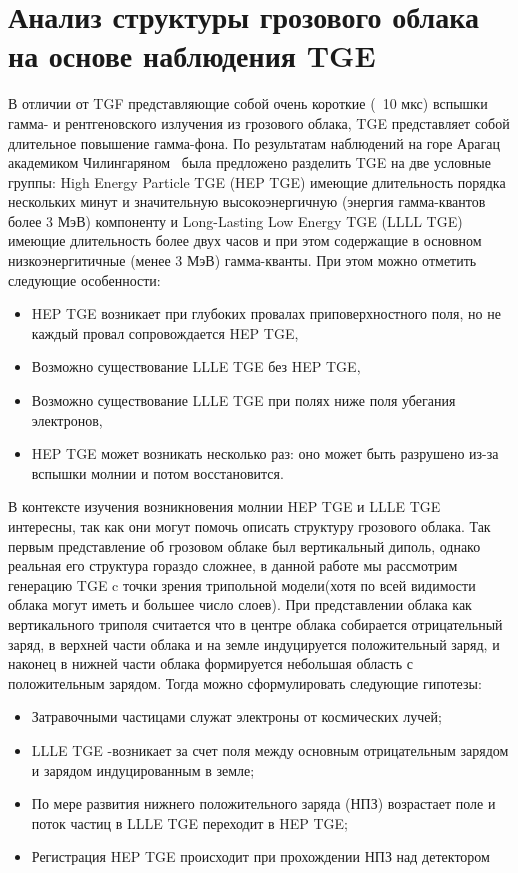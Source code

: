 \section{Анализ структуры грозового облака на основе наблюдения TGE}\label{sec:thunderstorm/llletge} 
В отличии от TGF представляющие собой очень короткие (~10 мкс) вспышки гамма- и рентгеновского излучения из грозового облака, TGE представляет собой длительное повышение гамма-фона. По результатам наблюдений на горе Арагац академиком Чилингаряном~\cite{PhysRevD.98.082001} была предложено разделить TGE на две условные группы: High Energy Particle TGE (HEP TGE) имеющие длительность порядка нескольких минут и значительную высокоэнергичную (энергия гамма-квантов более 3 МэВ) компоненту и Long-Lasting Low Energy TGE (LLLL TGE) имеющие длительность более двух часов и при этом содержащие в основном низкоэнергитичные (менее 3 МэВ) гамма-кванты. При этом можно отметить следующие особенности: 
\begin{itemize}
    \item HEP TGE  возникает при глубоких  провалах  приповерхностного поля, но не каждый провал сопровождается HEP TGE,
    \item Возможно существование LLLE TGE без  HEP TGE,
    \item Возможно существование LLLE TGE при полях ниже поля убегания электронов,
    \item HEP TGE может возникать несколько раз: оно может быть разрушено из-за вспышки молнии и потом восстановится.
\end{itemize}
В контексте изучения возникновения молнии HEP TGE и LLLE TGE интересны, так как они могут помочь описать структуру грозового облака.  Так первым представление об грозовом облаке был вертикальный диполь, однако реальная его структура гораздо сложнее, в данной работе мы рассмотрим генерацию TGE c точки зрения трипольной модели(хотя по всей видимости облака могут иметь и большее число слоев). При представлении облака как вертикального триполя считается что в центре облака собирается отрицательный заряд, в верхней части облака и на земле индуцируется положительный заряд, и наконец в нижней части облака формируется небольшая область с положительным зарядом. Тогда можно сформулировать следующие гипотезы:
\begin{itemize}
    \item Затравочными частицами служат электроны от космических лучей;
    \item LLLE TGE -возникает за счет поля между основным отрицательным зарядом и зарядом индуцированным в земле;
    \item По мере развития нижнего положительного заряда (НПЗ)  возрастает поле и поток частиц в LLLE TGE переходит в HEP TGE;
    \item Регистрация HEP TGE происходит при прохождении НПЗ над детектором
\end{itemize}
